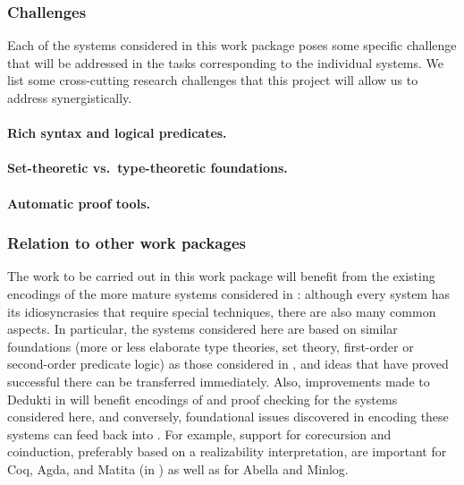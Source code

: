 \subsubsection*{Challenges}

Each of the systems considered in this work package poses some specific
challenge that will be addressed in the tasks corresponding to the individual
systems. We list some cross-cutting research challenges that this project will
allow us to address synergistically.

\paragraph*{Rich syntax and logical predicates.}



\paragraph*{Set-theoretic vs.\ type-theoretic foundations.}


\paragraph*{Automatic proof tools.}


\subsubsection*{Relation to other work packages}

The work to be carried out in this work package will benefit from the existing
encodings of the more mature systems considered in :
although every system has its idiosyncrasies that require special techniques,
there are also many common aspects. In particular, the systems considered here
are based on similar foundations (more or less elaborate type theories, set
theory, first-order or second-order predicate logic) as those considered in
, and ideas that have proved successful there can be
transferred immediately. Also, improvements made to Dedukti in
 will benefit encodings of and proof checking for the
systems considered here, and conversely, foundational issues discovered in
encoding these systems can feed back into . For example,
support for corecursion and coinduction, preferably based on a realizability
interpretation, are important for Coq, Agda, and Matita (in
) as well as for Abella and Minlog.

